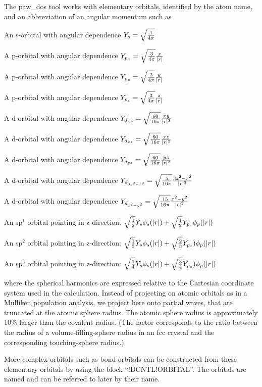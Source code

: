 \documentclass[final,12pt]{article}
\begin{document}
{{{{{{The paw\_dos tool works with elementary orbitals, identified by the atom
name, and an abbreviation of an angular momentum such as
\begin{description}
\item[s]An s-orbital with angular dependence 
$Y_s=\sqrt{1\over{4\pi}}$
\item[px]A p-orbital with angular dependence 
$Y_{p_x}=\sqrt{3\over{4\pi}} {x\over{|r|}}$
\item[py]A p-orbital with angular dependence 
$Y_{p_y}=\sqrt{3\over{4\pi}} {y\over{|r|}}$
\item[pz]A p-orbital with angular dependence 
$Y_{p_z}=\sqrt{3\over{4\pi}} {z\over{|r|}}$
\item[dxy]A d-orbital with angular dependence 
$Y_{d_{xy}}=\sqrt{60\over{16\pi}} {{xy}\over{|r|^2}}$
\item[dxz]A d-orbital with angular dependence 
$Y_{d_{xz}}=\sqrt{60\over{16\pi}} {{xz}\over{|r|^2}}$
\item[dyz]A d-orbital with angular dependence 
$Y_{d_{yz}}=\sqrt{60\over{16\pi}} {{yz}\over{|r|^2}}$
\item[d3z2-r2]A d-orbital with angular dependence 
$Y_{d_{3z^2-r^2}}=\sqrt{5\over{16\pi}} {{3z^2-r^2}\over{|r|^2}}$
\item[dx2-y2]A d-orbital with angular dependence 
$Y_{d_{x^2-y^2}}=\sqrt{15\over{16\pi}} {{x^2-y^2}\over{|r|^2}}$
\item[sp] An sp$^1$ orbital pointing in z-direction: 
$\sqrt{1\over{2}}Y_s \phi_s(|r|) + \sqrt{1\over{2}}Y_{p_z}\phi_p(|r|)$
\item[sp2] An sp$^2$ orbital pointing in z-direction: 
$\sqrt{1\over{3}}Y_s\phi_s(|r|) + \sqrt{2\over{3}}Y_{p_z})\phi_p(|r|)$
\item[sp3] An sp$^3$ orbital pointing in z-direction: 
$\sqrt{1\over{4}}Y_s\phi_s(|r|) + \sqrt{3\over{4}}Y_{p_z})\phi_p(|r|)$
\item
\end{description}
where the spherical harmonics are expressed relative to the Cartesian
coordinate system used in the calculation. Instead of projecting on
atomic orbitals as in a Mulliken population analysis, we project here
onto partial waves, that are truncated at the atomic sphere radius.
The atomic sphere radius is approximately 10\% larger than the
covalent radius. (The factor corresponds to the ratio between the
radius of a volume-filling-sphere radius in an fcc crystal and the
corresponding touching-sphere radius.)

More complex orbitals such as bond orbitals can be constructed from
these elementary orbitals by using the block ``!DCNTL!ORBITAL''. The
orbitals are named and can be referred to later by their name.

}}}}}}
\end{document}
